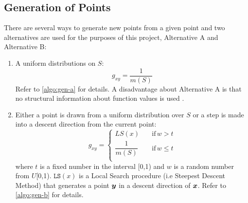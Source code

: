 \subsection{Generation of Points} 
\label{sec:gen-points}
There are several ways to generate new points from a given point and two alternatives are used for the purposes of this project, Alternative A and Alternative B:
\begin{enumerate}[label=\textbf{(\Alph*)}]
    \item A uniform distributions on $S$:
    \begin{equation}
        g_{xy}=\frac{1}{m(S)} 
    \end{equation}
    Refer to \cref{algo:gen-a} for details. A disadvantage about Alternative A is that no structural information about 
    function values is used \cite{dekkers}.

    \item Either a point is drawn from a uniform distribution over $S$ or a step is made into a descent direction from the current point:
    \begin{equation}
    g_{xy}=\begin{cases}
          LS(x) \quad &\text{if} \, w>t \\
          \dfrac{1}{m(S)} \quad &\text{if} \, w \leq t \\
     \end{cases} 
    \end{equation}
    where $t$ is a fixed number in the interval [0,1) and $w$ is a random number from $U$[0,1). 
    $\texttt{LS}(x)$ is a Local Search procedure (i.e Steepest Descent Method) that generates a point $\boldsymbol{y}$ in a 
    descent direction of $\boldsymbol{x}$. \cite{dekkers}
    Refer to \cref{algo:gen-b} for details.
\end{enumerate}









 
